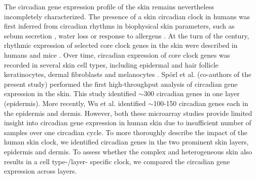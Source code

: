 The circadian gene expression profile of the skin remains nevertheless incompletely characterized. The presence of a skin circadian clock in humans was first inferred from circadian rhythms in biophysical skin parameters, such as sebum secretion \cite{Burton1970}, water loss \cite{Spruit1971} or response to allergens \cite{Reinberg1965}. At the turn of the century, rhythmic expression of selected core clock genes in the skin were described in humans \cite{Bjarnason2001} and mice \cite{Oishi2002}. Over time, circadian expression of core clock genes was recorded in several skin cell types, including epidermal and hair follicle keratinocytes, dermal fibroblasts and melanocytes \cite{Zanello2000, Kawara2002, Brown2005, Brown2008,Spoerl2011}. Sp\"orl et al. (co-authors of the present study) \cite{Spoerl2012} performed the first high-throughput analysis of circadian gene expression in the skin. This study identified $\sim$300 circadian genes in one layer (epidermis). More recently, Wu et al. \cite{Wu2018,Wu2020} identified $\sim$100-150 circadian genes each in the epidermis and dermis. However, both these microarray studies provide limited insight into circadian gene expression in human skin due to insufficient number of samples over one circadian cycle. To more thoroughly describe the impact of the human skin clock, we identified circadian genes in the two prominent skin layers, epidermis and dermis. To assess whether the complex and heterogeneous skin also results in a cell type-/layer- specific clock, we compared the circadian gene expression across layers. 

